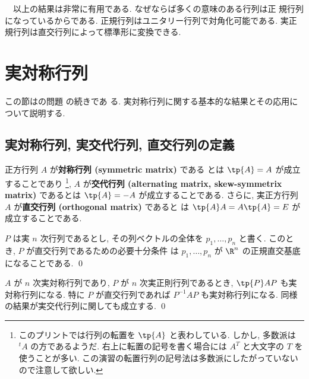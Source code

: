 \documentclass[12pt,twoside]{jarticle}
\begin{document}
\bigskip

\noindent
{\Large 　以上の結果は非常に有用である.  なぜならば多くの意味のある行列は正
  規行列になっているからである.  正規行列はユニタリー行列で対角化可能である.
  実正規行列は直交行列によって標準形に変換できる.}


\section{実対称行列}
\label{sec:real-symmetric}

この節はの問題  の続きであ
る.  実対称行列に関する基本的な結果とその応用について説明する.


\subsection{実対称行列, 実交代行列, 直交行列の定義}

正方行列 $A$ が{\bf 対称行列 (symmetric matrix)} である
とは $\tp{A}=A$ が成立することであり%
\footnote{このプリントでは行列の転置を $\tp{A}$ と表わしている. 
  しかし, 多数派は ${}^t\!A$ の方であるようだ.
  右上に転置の記号を書く場合には $A^T$ と大文字の $T$ を使うことが多い.
  この演習の転置行列の記号法は多数派にしたがっていないので注意して欲しい.}, 
$A$ が{\bf 交代行列 (alternating matrix, skew-symmetrix matrix)} 
であるとは $\tp{A}=-A$ が成立することである.
さらに, 実正方行列 $A$ が{\bf 直交行列 (orthogonal matrix)} であると
は $\tp{A}A=A\tp{A}=E$ が成立することである.


\begin{question}
  $P$ は実 $n$ 次行列であるとし, 
  その列ベクトルの全体を $p_1,\dots,p_n$ と書く.  
  このとき, $P$ が直交行列であるための必要十分条件
  は $p_1,\dots,p_n$ が $\R^n$ の正規直交基底になることである. \qed
\end{question}


\begin{question}
  $A$ が $n$ 次実対称行列であり, $P$ が $n$ 次実正則行列であるとき,
  $\tp{P}AP$ も実対称行列になる. 
  特に $P$ が直交行列であれば $P^{-1}AP$ も実対称行列になる.
  同様の結果が実交代行列に関しても成立する. \qed
\end{question}
\end{document}
